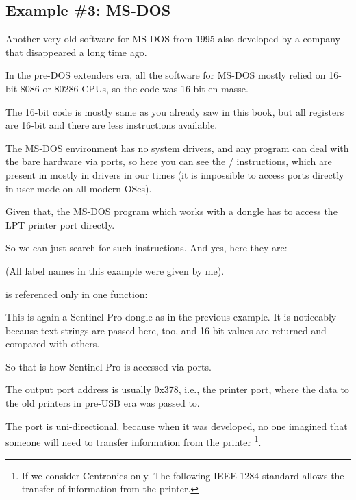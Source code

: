 \subsection{Example \#3: MS-DOS}
\label{dongle_16bit_dos}

Another very old software for MS-DOS from 1995 
also developed by a company that disappeared a long time ago.


In the pre-DOS extenders era, all the software for MS-DOS mostly relied on 16-bit 8086 or 80286 CPUs,
so the code was 16-bit en masse.

The 16-bit code is mostly same as you already saw in this book, but all registers
are 16-bit and there are less instructions available.

\label{IN_example}
\label{OUT_example}

The MS-DOS environment has no system drivers, and any program can deal with the bare hardware via ports,
so here you can see the / instructions, which are present in mostly in drivers in our times
(it is impossible to access ports directly in \gls{user mode} on all modern \ac{OS}es).

Given that, the MS-DOS program which works with a dongle has to access the LPT printer port directly.

So we can just search for such instructions. And yes, here they are:



(All label names in this example were given by me).

 is referenced only in one function:



This is again a Sentinel Pro  dongle as in the previous example.
It is noticeably because text strings are passed here, too, and 16 bit values are returned and compared with others.

So that is how Sentinel Pro is accessed via ports.

The output port address is usually 0x378, i.e.,
the printer port, where the data to the old printers in pre-USB era was passed to.

The port is uni-directional, because when it was developed, no one imagined that someone
will need to transfer information from the printer
\footnote{If we consider Centronics only. The following IEEE 1284 standard allows the transfer of information from
the printer.}.

